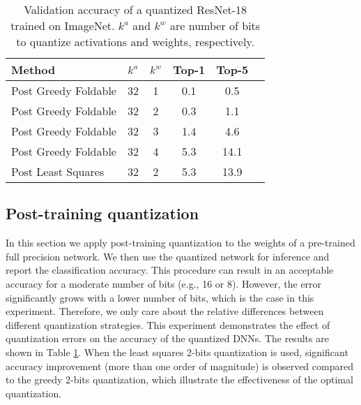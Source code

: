 \documentclass[10pt,twocolumn,letterpaper]{article}
\begin{document}
\begin{table}
\begin{center}
 \begin{tabular}{lccccc} \hline
 Method & $k^a$ & $k^w$& Top-1& Top-5\\
 \hline
 \hline
 Post Greedy Foldable & 32 & 1 & 0.1 & 0.5 \\
 Post Greedy Foldable & 32 & 2 & 0.3 & 1.1 \\
 Post Greedy Foldable & 32 & 3 & 1.4 & 4.6 \\
 Post Greedy Foldable & 32 & 4 & 5.3 & 14.1 \\
 Post Least Squares & 32 & 2 & 5.3 & 13.9 \\
  \end{tabular}
 \caption{Validation accuracy of a quantized ResNet-18 trained on ImageNet.
	  $k^a$ and $k^w$ are number of bits to quantize activations and weights, respectively.}
  \label{tab:compare_in}
  \end{center}
\end{table}

\subsection{Post-training quantization}
In this section we apply post-training quantization to the weights of a pre-trained full precision network.
We then use the quantized network for inference and report the classification accuracy.
This procedure can result in an acceptable accuracy for a moderate number of bits (e.g., 16 or 8). 
However, the error significantly grows with a lower number of bits, which is the case in this experiment.
Therefore, we only care about the relative differences between different quantization strategies.
This experiment demonstrates the effect of quantization errors on the accuracy of the quantized DNNs.
The results are shown in Table \ref{tab:compare_in}. When the least squares 2-bits quantization is used, significant accuracy improvement (more than one order of magnitude) is observed compared to the greedy 2-bits quantization, which illustrate the effectiveness of the optimal quantization.

\end{document}
